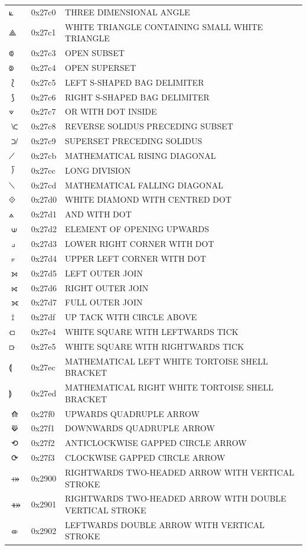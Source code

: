 \documentclass[12pt, twoside]{article}
\begin{document}
\begin{longtable}{L{1.0cm} L{2.0cm} >{\footnotesize}L{10cm}}
$⟀$&0x27c0&THREE DIMENSIONAL ANGLE\\
$⟁$&0x27c1&WHITE TRIANGLE CONTAINING SMALL WHITE TRIANGLE\\
$⟃$&0x27c3&OPEN SUBSET\\
$⟄$&0x27c4&OPEN SUPERSET\\
$⟅$&0x27c5&LEFT S-SHAPED BAG DELIMITER\\
$⟆$&0x27c6&RIGHT S-SHAPED BAG DELIMITER\\
$⟇$&0x27c7&OR WITH DOT INSIDE\\
$⟈$&0x27c8&REVERSE SOLIDUS PRECEDING SUBSET\\
$⟉$&0x27c9&SUPERSET PRECEDING SOLIDUS\\
$⟋$&0x27cb&MATHEMATICAL RISING DIAGONAL\\
$⟌$&0x27cc&LONG DIVISION\\
$⟍$&0x27cd&MATHEMATICAL FALLING DIAGONAL\\
$⟐$&0x27d0&WHITE DIAMOND WITH CENTRED DOT\\
$⟑$&0x27d1&AND WITH DOT\\
$⟒$&0x27d2&ELEMENT OF OPENING UPWARDS\\
$⟓$&0x27d3&LOWER RIGHT CORNER WITH DOT\\
$⟔$&0x27d4&UPPER LEFT CORNER WITH DOT\\
$⟕$&0x27d5&LEFT OUTER JOIN\\
$⟖$&0x27d6&RIGHT OUTER JOIN\\
$⟗$&0x27d7&FULL OUTER JOIN\\
$⟟$&0x27df&UP TACK WITH CIRCLE ABOVE\\
$⟤$&0x27e4&WHITE SQUARE WITH LEFTWARDS TICK\\
$⟥$&0x27e5&WHITE SQUARE WITH RIGHTWARDS TICK\\
$⟬$&0x27ec&MATHEMATICAL LEFT WHITE TORTOISE SHELL BRACKET\\
$⟭$&0x27ed&MATHEMATICAL RIGHT WHITE TORTOISE SHELL BRACKET\\
$⟰$&0x27f0&UPWARDS QUADRUPLE ARROW\\
$⟱$&0x27f1&DOWNWARDS QUADRUPLE ARROW\\
$⟲$&0x27f2&ANTICLOCKWISE GAPPED CIRCLE ARROW\\
$⟳$&0x27f3&CLOCKWISE GAPPED CIRCLE ARROW\\
$⤀$&0x2900&RIGHTWARDS TWO-HEADED ARROW WITH VERTICAL STROKE\\
$⤁$&0x2901&RIGHTWARDS TWO-HEADED ARROW WITH DOUBLE VERTICAL STROKE\\
$⤂$&0x2902&LEFTWARDS DOUBLE ARROW WITH VERTICAL STROKE\\

\end{longtable}
\end{document}
